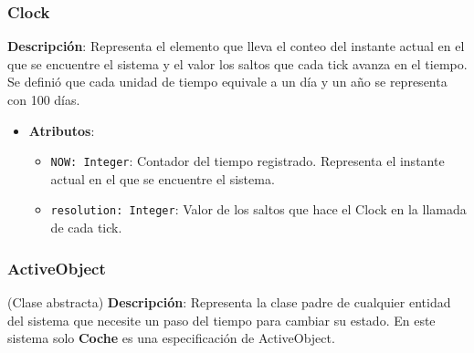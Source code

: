 \documentclass[12pt.a4paper]{article}
\begin{document}
\subsubsection{Clock}
\textbf{Descripción}:  
Representa el elemento que lleva el conteo del instante actual en el que se encuentre el sistema y el valor los saltos que cada tick avanza en el tiempo. Se definió que cada unidad de tiempo equivale a un día y un año se representa con 100 días.
\begin{itemize}
    \item \textbf{Atributos}:
    \begin{itemize}
        \item \texttt{NOW: Integer}: Contador del tiempo registrado. Representa el instante actual en el que se encuentre el sistema.
        \item \texttt{resolution: Integer}: Valor de los saltos que hace el Clock en la llamada de cada tick.
    \end{itemize}
\end{itemize}

\subsubsection{ActiveObject} (Clase abstracta)
\textbf{Descripción}:  
Representa la clase padre de cualquier entidad del sistema que necesite un paso del tiempo para cambiar su estado. En este sistema solo \textbf{Coche} es una especificación de ActiveObject.
\end{document}
